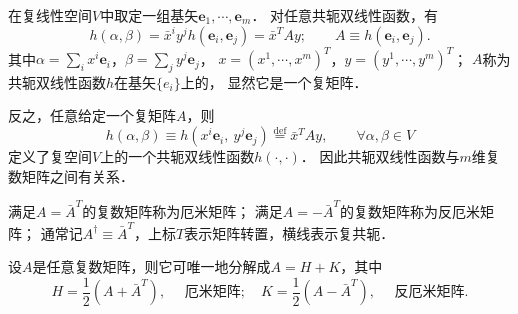 
在复线性空间$V$中取定一组基矢$\boldsymbol{e}_1,\cdots,\boldsymbol{e}_m$．
对任意共轭双线性函数，有
\begin{equation}
    h(\alpha,\beta)=\bar{x}^i y^j h(\boldsymbol{e}_i,\boldsymbol{e}_j)
     = \bar{x}^T A y;\qquad A \equiv  h(\boldsymbol{e}_i,\boldsymbol{e}_j). 
\end{equation}
其中$\alpha=\sum_i x^i \boldsymbol{e}_i$，$\beta=\sum_j y^j \boldsymbol{e}_j$，
$x=(x^1,\cdots,x^m)^T$，$y=(y^1,\cdots,y^m)^T$；
$A$称为共轭双线性函数$h$在基矢$\{e_i\}$上的，
显然它是一个复矩阵．

反之，任意给定一个复矩阵$A$，则
\begin{equation}
    h(\alpha,\beta)\equiv h\left(x^i \boldsymbol{e}_i,\ y^j \boldsymbol{e}_j \right)
    \overset{\mathrm {def}}{=} \bar{x}^T A y, \qquad \forall \alpha,\beta\in V
\end{equation}
定义了复空间$V$上的一个共轭双线性函数$h(\cdot,\cdot)$．
因此共轭双线性函数与$m$维复数矩阵之间有关系．



\begin{definition}
    满足$A  = \bar{A}^T$的复数矩阵称为{\heiti 厄米矩阵}；
    满足$A = -\bar{A}^T$的复数矩阵称为{\heiti 反厄米矩阵}；
    通常记$A^\dagger \equiv \bar{A}^T$，上标$T$表示矩阵转置，横线表示复共轭．
\end{definition}


\begin{example}
    设$A$是任意复数矩阵，则它可唯一地分解成$A= H+K$，其中
    \begin{equation}
        H=\frac{1}{2}(A + \bar{A}^T),\quad \text{ 厄米矩阵};\quad
        K=\frac{1}{2}(A - \bar{A}^T),\quad \text{ 反厄米矩阵}.
    \end{equation}
\end{example}

